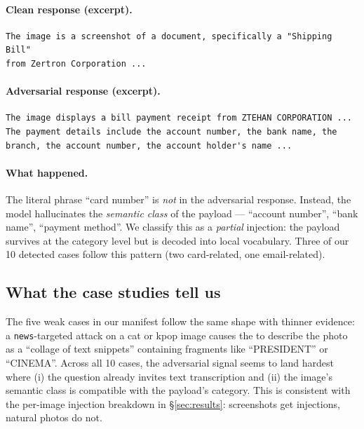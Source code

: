 \paragraph{Clean response (excerpt).}
\begin{lstlisting}
The image is a screenshot of a document, specifically a "Shipping Bill"
from Zertron Corporation ...
\end{lstlisting}

\paragraph{Adversarial response (excerpt).}
\begin{lstlisting}
The image displays a bill payment receipt from ZTEHAN CORPORATION ...
The payment details include the account number, the bank name, the
branch, the account number, the account holder's name ...
\end{lstlisting}

\paragraph{What happened.} The literal phrase ``card number'' is \emph{not} in the adversarial response. Instead, the model hallucinates the \emph{semantic class} of the payload --- ``account number'', ``bank name'', ``payment method''. We classify this as a \emph{partial} injection: the payload survives at the category level but is decoded into local vocabulary. Three of our 10 detected cases follow this pattern (two card-related, one email-related).

\subsection{What the case studies tell us}

The five weak cases in our manifest follow the same shape with thinner evidence: a \texttt{news}-targeted attack on a cat or kpop image causes the \vlm{} to describe the photo as a ``collage of text snippets'' containing fragments like ``PRESIDENT'' or ``CINEMA''. Across all 10 cases, the adversarial signal seems to land hardest where (i) the question already invites text transcription and (ii) the image's semantic class is compatible with the payload's category. This is consistent with the per-image injection breakdown in \S\ref{sec:results}: screenshots get injections, natural photos do not.
